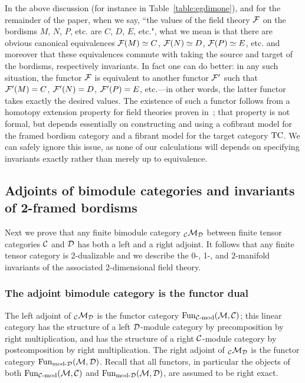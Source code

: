 \documentclass{amsart}
\begin{document}
\begin{remark} \label{rem:hep}
In the above discussion (for instance in Table~\ref{table:egdimone}), and for the remainder of the paper, when we say, ``the values of the field theory $\mathcal F$ on the bordisms $M$, $N$, $P$, etc. are $C$, $D$, $E$, etc.", what we mean is that there are obvious canonical equivalences $\mathcal F(M) \simeq C$, $\mathcal F(N) \simeq D$, $\mathcal F(P) \simeq E$, etc. and moreover that these equivalences commute with taking the source and target of the bordisms, respectively invariants.  In fact one can do better: in any such situation, the functor $\mathcal F$ is equivalent to another functor $\mathcal F'$ such that $\mathcal F'(M) = C$, $\mathcal F'(N) = D$, $\mathcal F'(P) = E$, etc.---in other words, the latter functor takes exactly the desired values.  The existence of such a functor follows from a homotopy extension property for field theories proven in~\cite{3TC}; that property is not formal, but depends essentially on constructing and using a cofibrant model for the framed bordism category and a fibrant model for the target category $\mathrm{TC}$.  We can safely ignore this issue, as none of our calculations will depends on specifying invariants exactly rather than merely up to equivalence.
\end{remark}


\subsection{Adjoints of bimodule categories and invariants of 2-framed bordisms}   \label{sec:df-morphisms}


Next we prove that any finite bimodule category ${}_\mathcal C \mathcal M_\mathcal D$ between finite tensor categories $\mathcal C$ and $\mathcal D$ has both a left and a right adjoint.  It follows that any finite tensor category is 2-dualizable and we describe the 0-, 1-, and 2-manifold invariants of the associated 2-dimensional field theory.

\subsubsection{The adjoint bimodule category is the functor dual} \label{sec:df-modules}

The left adjoint of ${}_\mathcal C \mathcal M_\mathcal D$ is the functor category $\Fun_{\mod{\cC}{}}(\cM,\cC)$; this linear category has the structure of a left $\mathcal D$-module category by precomposition by right multiplication, and has the structure of a right $\mathcal C$-module category by postcomposition by right multiplication.  The right adjoint of ${}_\mathcal C \mathcal M_\mathcal D$ is the functor category $\Fun_{\mod{}{\cD}}(\cM,\cD)$.  Recall that all functors, in particular the objects of both $\Fun_{\mod{\cC}{}}(\cM,\cC)$ and $\Fun_{\mod{}{\cD}}(\cM,\cD)$, are assumed to be right exact.
\end{document}
